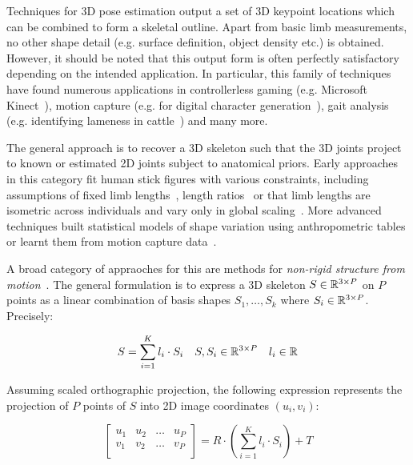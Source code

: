     Techniques for 3D pose estimation output a set of 3D keypoint locations which can be combined to form a skeletal outline. Apart from basic limb measurements, no other shape detail (e.g. surface definition, object density etc.) is obtained. However, it should be noted that this output form is often perfectly satisfactory depending on the intended application. In particular, this family of techniques have found numerous applications in controllerless gaming (e.g. Microsoft Kinect~\cite{kinectpaper}), motion capture (e.g. for digital character generation~\cite{xxx}), gait analysis (e.g. identifying lameness in cattle~\cite{xxx}) and many more. 
    
    The general approach is to recover a 3D skeleton such that the 3D joints project to known or estimated 2D joints subject to anatomical priors. Early approaches in this category fit human stick figures with various constraints, including assumptions of fixed limb lengths~\cite{xxx}, length ratios~\cite{xxx} or that limb lengths are isometric across individuals and vary only in global scaling~\cite{xxx}. More advanced techniques built statistical models of shape variation using anthropometric tables or learnt them from motion capture data~\cite{barron2001estimating}.

    A broad category of appraoches for this are methods for \emph{non-rigid structure from motion}~\cite{xxx}. The general formulation is to express a 3D skeleton $S \in {\mathbb{R}^{3 \times P}}$ on $P$ points as a linear combination of basis shapes $S_{1}, \dots, S_{k}$ where $S_{i} \in {\mathbb{R}^{3 \times P}}$. Precisely:
    
    \begin{equation}
        S = \sum_{i=1}^K l_{i} \cdot S_{i} \quad S, S_{i} \in {\mathbb{R}^{3 \times P}} \quad l_{i} \in {\mathbb{R}^{}}
    \end{equation}
    
    Assuming scaled orthographic projection, the following expression represents the projection of $P$ points of $S$ into 2D image coordinates $(u_{i}, v_{i})$:
    
    \begin{equation}
        \begin{bmatrix}
            u_{1} & u_{2} & \dots & u_{P} \\
            v_{1} & v_{2} & \dots & v_{P} \\
        \end{bmatrix}
        = R \cdot ( \sum_{i=1}^{K} l_{i} \cdot S_{i} ) + T
    \end{equation}

